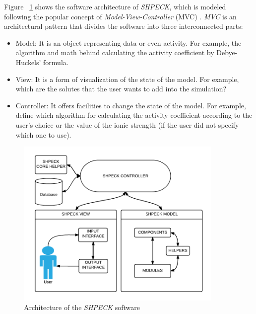 Figure ~\ref{fig:shpeck-architecture} shows the software architecture of \emph{SHPECK}, which is modeled following the popular concept of \emph{Model-View-Controller} (MVC) \cite{Gamma:94}. \emph{MVC} is an architectural pattern that divides the software into three interconnected parts:
\begin{itemize}
\item Model: It is an object representing data or even activity. For example, the algorithm and math behind calculating the activity coefficient by Debye-Huckels' formula.
\item View: It is a form of visualization of the state of the model. For example, which are the solutes that the user wants to add into the simulation?
\item Controller: It offers facilities to change the state of the model. For example, define which algorithm for calculating the activity coefficient according to the user's choice or the value of the ionic strength (if the user did not specify which one to use).
\end{itemize}

\begin{figure}[ht!]
\centering
\includegraphics[width=100mm]{figures/shpeck-architecture.png}
\caption{Architecture of the \emph{SHPECK} software}
\label{fig:shpeck-architecture}
\end{figure}

